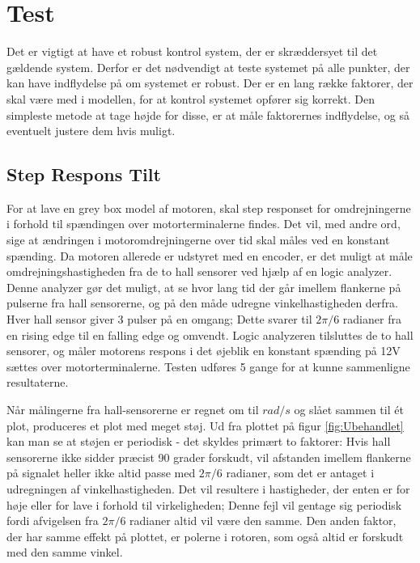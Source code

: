 \section{Test}

Det er vigtigt at have et robust kontrol system, der er skræddersyet til det gældende system. Derfor er det nødvendigt at teste systemet på alle punkter, der kan have indflydelse på om systemet er robust. Der er en lang række faktorer, der skal være med i modellen, for at kontrol systemet opfører sig korrekt. Den simpleste metode at tage højde for disse, er at måle faktorernes indflydelse, og så eventuelt justere dem hvis muligt.

\subsection{Step Respons Tilt}

For at lave en grey box model af motoren, skal step responset for omdrejningerne i forhold til spændingen over motorterminalerne findes. Det vil, med andre ord, sige at ændringen i motoromdrejningerne over tid skal måles ved en konstant spænding. Da motoren allerede er udstyret med en encoder, er det muligt at måle omdrejningshastigheden fra de to hall sensorer ved hjælp af en logic analyzer. Denne analyzer gør det muligt, at se hvor lang tid der går imellem flankerne på pulserne fra hall sensorerne, og på den måde udregne vinkelhastigheden derfra. 
Hver hall sensor giver 3 pulser på en omgang; Dette svarer til $2\pi/6$ radianer fra en rising edge til en falling edge og omvendt. Logic analyzeren tilsluttes de to hall sensorer, og måler motorens respons i det øjeblik en konstant spænding på 12V sættes over motorterminalerne. Testen udføres 5 gange for at kunne sammenligne resultaterne. 

Når målingerne fra hall-sensorerne er regnet om til $rad/s$ og slået sammen til ét plot, produceres et plot med meget støj. Ud fra plottet på figur \ref{fig:Ubehandlet} kan man se at støjen er periodisk - det skyldes primært to faktorer: Hvis hall sensorerne ikke sidder præcist 90 grader forskudt, vil afstanden imellem flankerne på signalet heller ikke altid passe med $2\pi/6$ radianer, som det er antaget i udregningen af vinkelhastigheden. Det vil resultere i hastigheder, der enten er for høje eller for lave i forhold til virkeligheden; Denne fejl vil gentage sig periodisk fordi afvigelsen fra $2\pi/6$ radianer altid vil være den samme. Den anden faktor, der har samme effekt på plottet, er polerne i rotoren, som også altid er forskudt med den samme vinkel.

